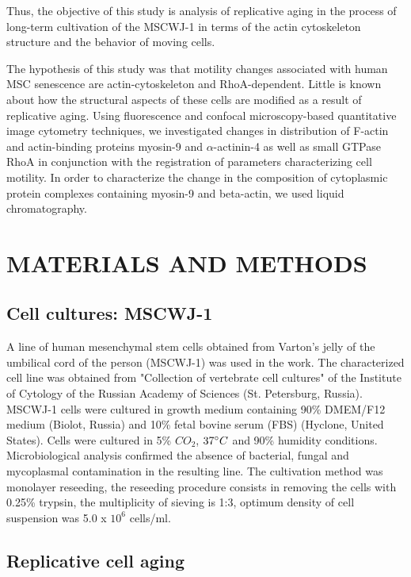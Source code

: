 \documentclass[english,authoryear]{elsarticle}
\begin{document}
Thus, the objective of this study is analysis of replicative aging in the process of long-term cultivation of the MSCWJ-1 in terms of the actin cytoskeleton structure and the behavior of moving cells.


The hypothesis of this study was that motility changes associated with human MSC senescence are actin-cytoskeleton and RhoA-dependent.
Little is known about how the structural aspects of these cells are modified as a result of replicative aging.
Using fluorescence and confocal microscopy-based quantitative image cytometry techniques, we investigated changes in distribution of F-actin and actin-binding proteins myosin-9 and $\alpha$-actinin-4 as well as small GTPase RhoA in conjunction with the registration of parameters characterizing cell motility.
In order to characterize the change in the composition of cytoplasmic protein complexes containing myosin-9 and beta-actin, we used liquid chromatography.



\section{MATERIALS AND METHODS}

\subsection{Cell cultures: MSCWJ-1}

A line of human mesenchymal stem cells obtained from Varton's jelly of the umbilical cord of the person (MSCWJ-1) was used in the work.
The characterized cell line was obtained from "Collection of vertebrate cell cultures" of the Institute of Cytology of the Russian Academy of Sciences (St. Petersburg, Russia).
MSCWJ-1 cells were cultured in growth medium containing 90\% DMEM/F12 medium (Biolot, Russia) and 10\% fetal bovine serum (FBS) (Hyclone, United States).
Cells were cultured in 5\% $CO_2$, $37\degree C$ and 90\% humidity conditions.
Microbiological analysis confirmed the absence of bacterial, fungal and mycoplasmal contamination in the resulting line.
The cultivation method was monolayer reseeding, the reseeding procedure consists in removing the cells with 0.25\% trypsin, the multiplicity of sieving is 1:3, optimum density of cell suspension was 5.0 x $10^{6}$ cells/ml.

\subsection{Replicative cell aging}
\end{document}
